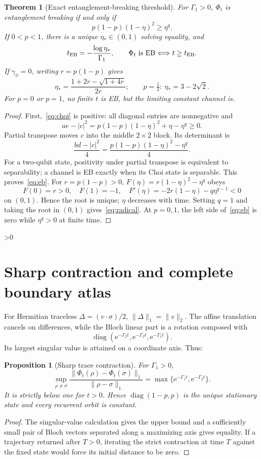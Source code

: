 \documentclass[10pt]{article}
\providecommand{\CRevisionRound}{2}
\newtheorem{theorem}{Theorem}
\newtheorem{proposition}{Proposition}
\newcommand{\diag}{\operatorname{diag}}
\newcommand{\ee}{\mathrm e}
\begin{document}
\begin{theorem}[Exact entanglement-breaking threshold]\label{thm:eb}
For $\Gamma_1>0$, $\Phi_t$ is entanglement breaking if and only if
\begin{equation}\label{eq:eb}
 p(1-p)(1-\eta)^2\geq\eta^q.
\end{equation}
If $0<p<1$, there is a unique $\eta_*\in(0,1)$ solving equality, and
\[
 t_{\rm EB}=-\frac{\log\eta_*}{\Gamma_1},\qquad
 \Phi_t\text{ is EB}\Longleftrightarrow t\geq t_{\rm EB}.
\]
If $\gamma_\phi=0$, writing $r=p(1-p)$ gives
\begin{equation}\label{eq:radical}
 \eta_*=\frac{1+2r-\sqrt{1+4r}}{2r};
 \qquad p=\tfrac12:\ \eta_*=3-2\sqrt2.
\end{equation}
For $p=0$ or $p=1$, no finite $t$ is EB, but the limiting constant channel is.
\end{theorem}
\begin{proof}
First,~\eqref{eq:choi} is positive: all diagonal entries are nonnegative and
\[
 ae-|c|^2=p(1-p)(1-\eta)^2+\eta-\eta^q\geq0.
\]
Partial transpose moves $c$ into the middle $2\times2$ block.  Its determinant
is
\[
 \frac{bd-|c|^2}{4}
 =\frac{p(1-p)(1-\eta)^2-\eta^q}{4}.
\]
For a two-qubit state, positivity under partial transpose is equivalent to
separability; a channel is EB exactly when its Choi state is separable.
This proves~\eqref{eq:eb}.  For $r=p(1-p)>0$,
$F(\eta)=r(1-\eta)^2-\eta^q$ obeys
\[
 F(0)=r>0,\quad F(1)=-1,\quad
 F'(\eta)=-2r(1-\eta)-q\eta^{q-1}<0
\]
on $(0,1)$.  Hence the root is unique; $\eta$ decreases with time.  Setting
$q=1$ and taking the root in $(0,1)$ gives~\eqref{eq:radical}.  At $p=0,1$,
the left side of~\eqref{eq:eb} is zero while $\eta^q>0$ at finite time.
\end{proof}

\ifnum\CRevisionRound>0
\section{Sharp contraction and complete boundary atlas}
For Hermitian traceless $\Delta=(v\cdot\sigma)/2$,
$\|\Delta\|_1=\|v\|_2$.  The affine translation cancels on differences,
while the Bloch linear part is a rotation composed with
\[
 \diag(\ee^{-\Gamma_2t},\ee^{-\Gamma_2t},\ee^{-\Gamma_1t}).
\]
Its largest singular value is attained on a coordinate axis.  Thus:

\begin{proposition}[Sharp trace contraction]\label{prop:contract}
For $\Gamma_1>0$,
\[
 \sup_{\rho\ne\sigma}
 \frac{\|\Phi_t(\rho)-\Phi_t(\sigma)\|_1}{\|\rho-\sigma\|_1}
 =\max\{\ee^{-\Gamma_1t},\ee^{-\Gamma_2t}\}.
\]
It is strictly below one for $t>0$.  Hence $\diag(1-p,p)$ is the unique
stationary state and every recurrent orbit is constant.
\end{proposition}
\begin{proof}
The singular-value calculation gives the upper bound and a sufficiently small
pair of Bloch vectors separated along a maximizing axis gives equality.
If a trajectory returned after $T>0$, iterating the strict contraction at
time $T$ against the fixed state would force its initial distance to be zero.
\end{proof}
\end{document}
